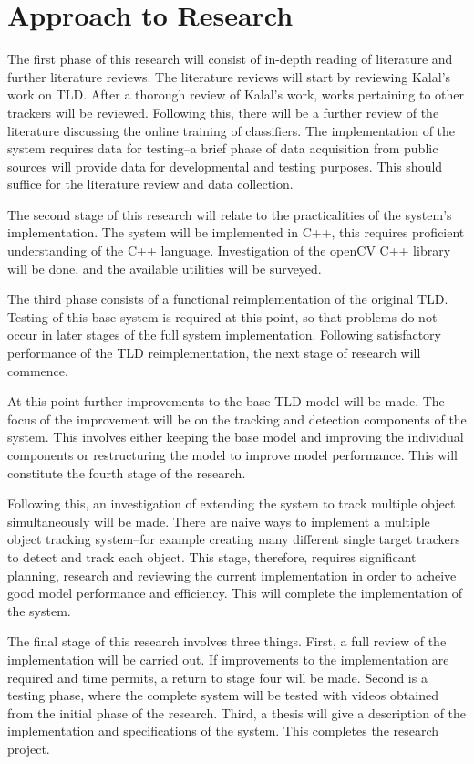 \section{Approach to Research}
  The first phase of this research will consist of in-depth reading of literature and further literature reviews.
  The literature reviews will start by reviewing Kalal's work on TLD.
  After a thorough review of Kalal's work, works pertaining to other trackers will be reviewed.
  Following this, there will be a further review of the literature discussing the online training of classifiers.
  The implementation of the system requires data for testing--a brief phase of data acquisition from public sources will provide data for developmental and testing purposes.
  This should suffice for the literature review and data collection.

  The second stage of this research will relate to the practicalities of the system's implementation.
  The system will be implemented in C++, this requires proficient understanding of the C++ language.
  Investigation of the openCV C++ library will be done, and the available utilities will be surveyed.

  The third phase consists of a functional reimplementation of the original TLD.
  Testing of this base system is required at this point, so that problems do not occur in later stages of the full system implementation.
  Following satisfactory performance of the TLD reimplementation, the next stage of research will commence.

  At this point further improvements to the base TLD model will be made.
  The focus of the improvement will be on the tracking and detection components of the system. 
  This involves either keeping the base model and improving the individual components or restructuring the model to improve model performance.
  This will constitute the fourth stage of the research.

  Following this, an investigation of extending the system to track multiple object simultaneously will be made.
  There are naive ways to implement a multiple object tracking system--for example creating many different single target trackers to detect and track each object.
  This stage, therefore, requires significant planning, research and reviewing the current implementation in order to acheive good model performance and efficiency.
  This will complete the implementation of the system.

  The final stage of this research involves three things.
  First, a full review of the implementation will be carried out.
  If improvements to the implementation are required and time permits, a return to stage four will be made.
  Second is a testing phase, where the complete system will be tested with videos obtained from the initial phase of the research.
  Third, a thesis will give a description of the implementation and specifications of the system.
  This completes the research project.
